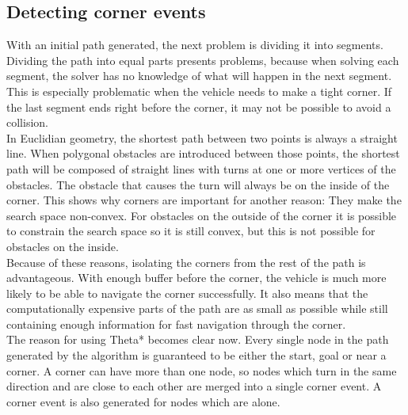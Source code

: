 \documentclass[12pt]{article}
\begin{document}
\subsection{Detecting corner events}
With an initial path generated, the next problem is dividing it into segments. Dividing the path into equal parts presents problems, because when solving each segment, the solver has no knowledge of what will happen in the next segment. This is especially problematic when the vehicle needs to make a tight corner. If the last segment ends right before the corner, it may not be possible to avoid a collision.\\
In Euclidian geometry, the shortest path between two points is always a straight line. When polygonal obstacles are introduced between those points, the shortest path will be composed of straight lines with turns at one or more vertices of the obstacles. The obstacle that causes the turn will always be on the inside of the corner. This shows why corners are important for another reason: They make the search space non-convex. For obstacles on the outside of the corner it is possible to constrain the search space so it is still convex, but this is not possible for obstacles on the inside.\\
Because of these reasons, isolating the corners from the rest of the path is advantageous. With enough buffer before the corner, the vehicle is much more likely to be able to navigate the corner successfully. It also means that the computationally expensive parts of the path are as small as possible while still containing enough information for fast navigation through the corner.
\\
The reason for using Theta* becomes clear now. Every single node in the path generated by the algorithm is guaranteed to be either the start, goal or near a corner. A corner can have more than one node, so nodes which turn in the same direction and are close to each other are merged into a single corner event. A corner event is also generated for nodes which are alone.
\end{document}
